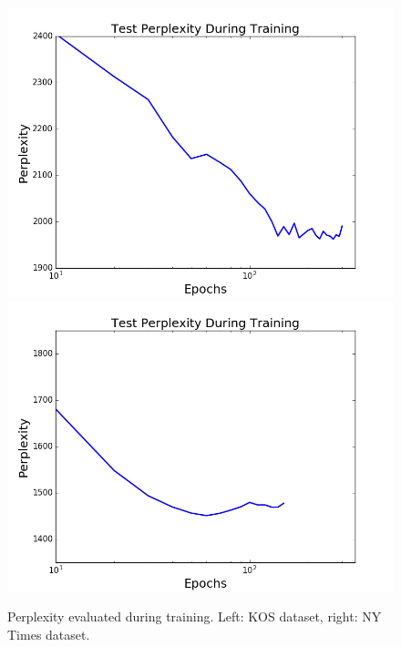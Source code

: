 \documentclass{report}
\begin{document}
	
	\begin{figure}
		\includegraphics[scale = 0.40]{img/kos_200_0_perp.png}
		\includegraphics[scale = 0.40]{img/ny_400_50_perp.png}
		\caption{Perplexity evaluated during training. Left: KOS dataset, right: NY Times dataset.}
		\label{perp_first}
	\end{figure}
	
	
\end{document}
